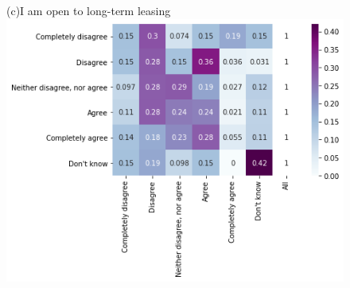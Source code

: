 \documentclass[12pt]{article}
\begin{document}
\begin{figure}[h!!]
\begin{minipage}[h!!]{0.32\textwidth}
	\end{minipage}
	\begin{minipage}[h!!]{0.32\textwidth}  
		\centering\footnotesize{(c)I am open to long-term leasing}
		\includegraphics[width=1\textwidth]{../codding_data/results/liss/conditional_heatmap181_141labels0.png}
	\end{minipage}
\end{figure}
\end{document}
